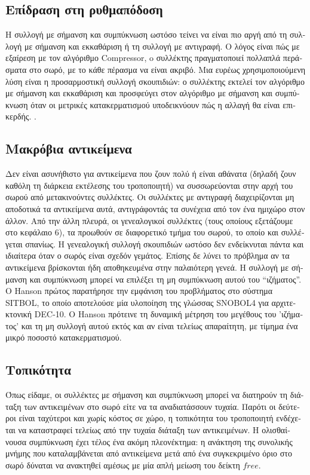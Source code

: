 \begin{greek}
\subsection{Επίδραση στη ρυθμαπόδοση}
Η συλλογή με σήμανση και συμπύκνωση ωστόσο τείνει να είναι πιο αργή από τη 
συλλογή με σήμανση και εκκαθάριση ή τη συλλογή με αντιγραφή. Ο λόγος είναι πώς 
με εξαίρεση με τον αλγόριθμο Compressor, o συλλέκτης πραγματοποιεί πολλαπλά 
περάσματα στο σωρό, με το κάθε πέρασμα να είναι ακριβό. Μια ευρέως χρησιμοποιούμενη
λύση είναι η προσαρμοστική συλλογή σκουπιδιών: ο συλλέκτης εκτελεί τον αλγόριθμο
με σήμανση και εκκαθάριση και προσφεύγει στον αλγόριθμο με σήμανση και συμπύκνωση
όταν οι μετρικές κατακερματισμού υποδεικνύουν πώς η αλλαγή θα είναι επικερδής.
\cite{DBLP:conf/jvm/Printezis01, DBLP:conf/iwmm/SomanKB04}.   

\subsection{Μακρόβια αντικείμενα}
Δεν είναι ασυνήθιστο για αντικείμενα που ζουν πολύ ή είναι αθάνατα (δηλαδή ζουν
καθόλη τη διάρκεια εκτέλεσης του τροποποιητή) να συσσωρεύονται στην αρχή του
σωρού από μετακινούντες συλλέκτες. Οι συλλέκτες με αντιγραφή διαχειρίζονται μη
αποδοτικά τα αντικείμενα αυτά, αντιγράφοντάς τα συνέχεια από τον ένα ημιχώρο
στον άλλον. Από την άλλη πλευρά, οι γενεαλογικοί συλλέκτες (τους οποίους
εξετάζουμε στο κεφάλαιο 6), τα προωθούν σε διαφορετικό τμήμα του σωρού, το
οποίο και συλλέγεται σπανίως. Η γενεαλογική συλλογή σκουπιδιών ωστόσο δεν
ενδείκνυται πάντα και ιδιαίτερα όταν ο σωρός είναι σχεδόν γεμάτος. Επίσης δε
λύνει το πρόβλημα αν τα αντικείμενα βρίσκονται ήδη αποθηκευμένα στην παλαιότερη
γενεά. Η συλλογή με σήμανση και συμπύκνωση μπορεί να επιλέξει τη μη συμπύκνωση
αυτού του ``ιζήματος''. O Hanson \cite{DBLP:journals/spe/Hanson77} πρώτος
παρατήρησε την εμφάνιση του προβλήματος στο σύστημα SITBOL, το οποίο αποτελούσε
μία υλοποίηση της γλώσσας SNOBOL4 για αρχιτεκτονική DEC-10. O Hanson πρότεινε
τη δυναμική μέτρηση του μεγέθους του 'ιζήματος' και τη μη συλλογή αυτού εκτός
και αν είναι τελείως απαραίτητη, με τίμημα ένα μικρό ποσοστό κατακερματισμού.

\subsection{Τοπικότητα}
Όπως είδαμε, οι συλλέκτες με σήμανση και συμπύκνωση μπορεί να διατηρούν τη
διάταξη των αντικειμένων στο σωρό είτε να τα αναδιατάσσουν τυχαία. Παρότι
οι δεύτεροι είναι ταχύτεροι και χωρίς κόστος σε χώρο, η τοπικότητα του
τροποποιητή ενδέχεται να καταστραφεί τελείως από την τυχαία διάταξη των
αντικειμένων. Η ολισθαίνουσα συμπύκνωση έχει τέλος ένα ακόμη πλεονέκτημα:
η ανάκτηση της συνολικής μνήμης που καταλαμβάνεται από αντικείμενα μετά
από ένα συγκεκριμένο όριο στο σωρό δύναται να ανακτηθεί αμέσως με μία απλή
μείωση του δείκτη $free$.


\end{greek}
